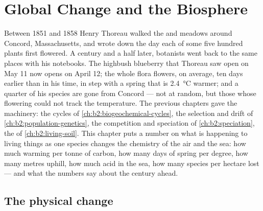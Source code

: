 \chapter{Global Change and the Biosphere}\label{ch:b2:global-change}

Between 1851 and 1858 Henry Thoreau walked the  and meadows
around Concord, Massachusetts, and wrote down the day each of some
five hundred plants first flowered. A century and a half later,
botanists went back to the same places with his notebooks. The
highbush blueberry that Thoreau saw open on May 11 now opens on
April 12; the whole flora flowers, on average, ten days earlier
than in his time, in step with a spring that is \qty{2.4}{\celsius}
warmer; and a quarter of his species are gone from Concord --- not
at random, but those whose flowering could not track the
temperature. The previous chapters gave the machinery: the cycles
of \cref{ch:b2:biogeochemical-cycles}, the selection and drift of
\cref{ch:b2:population-genetics}, the competition and speciation
of \cref{ch:b2:speciation}, the  of \cref{ch:b2:living-soil}.
This chapter puts a number on what is happening to living things
as one species changes the chemistry of the air and the sea: how
much warming per tonne of carbon, how many days of spring per
degree, how many metres uphill, how much acid in the sea, how many
species per hectare lost --- and what the numbers say about the
century ahead.

\section{The physical change}

